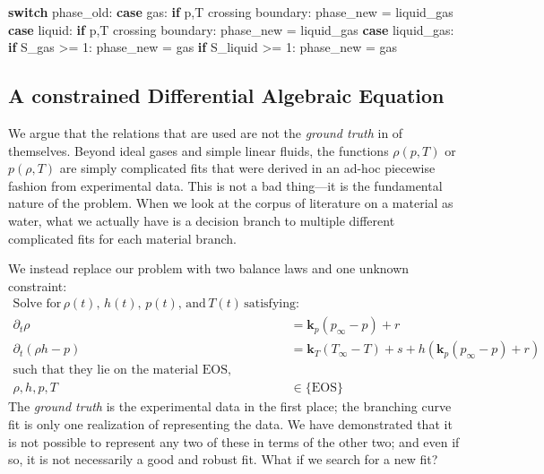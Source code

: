 \documentclass[]{article}
\newenvironment{Shaded}{}{}
\newcommand{\ControlFlowTok}[1]{\textcolor[rgb]{0.00,0.44,0.13}{\textbf{#1}}}
\newcommand{\DecValTok}[1]{\textcolor[rgb]{0.25,0.63,0.44}{#1}}
\newcommand{\NormalTok}[1]{#1}
\begin{document}
\begin{Shaded}
\begin{Highlighting}[]
\ControlFlowTok{switch}\NormalTok{ phase_old:}
  \ControlFlowTok{case}\NormalTok{ gas:}
    \ControlFlowTok{if}\NormalTok{ p,T crossing boundary:}
\NormalTok{      phase_new = liquid_gas}
  \ControlFlowTok{case}\NormalTok{ liquid:}
    \ControlFlowTok{if}\NormalTok{ p,T crossing boundary:}
\NormalTok{      phase_new = liquid_gas}
  \ControlFlowTok{case}\NormalTok{ liquid_gas:}
    \ControlFlowTok{if}\NormalTok{ S_gas >= }\DecValTok{1}\NormalTok{:}
\NormalTok{      phase_new = gas}
    \ControlFlowTok{if}\NormalTok{ S_liquid >= }\DecValTok{1}\NormalTok{:}
\NormalTok{      phase_new = gas}
\end{Highlighting}
\end{Shaded}

\hypertarget{header-n3262}{%
\subsection{A constrained Differential Algebraic
Equation}\label{header-n3262}}

We argue that the relations that are used are not the \emph{ground
truth} in of themselves. Beyond ideal gases and simple linear fluids,
the functions \(\rho(p,T)\) or \(p(\rho,T)\) are simply complicated fits
that were derived in an ad-hoc piecewise fashion from experimental data.
This is not a bad thing---it is the fundamental nature of the problem.
When we look at the corpus of literature on a material as water, what we
actually have is a decision branch to multiple different complicated
fits for each material branch.

We instead replace our problem with two balance laws and one unknown
constraint:
\begin{align}
\text{Solve for}\, \rho(t), \, h(t), \, p(t),\, \text{and}\, T(t)\, \text{satisfying:}\\
\partial_t \rho &  = \mathbf{k}_p(p_\infty - p) + r\\
\partial_t (\rho h-p) & = \mathbf{k}_T(T_\infty-T)  + s + h\left(\mathbf{k}_p(p_\infty - p) + r\right) \\
\text{such that they lie on the material EOS,}\\
\rho,h,p,T & \in \{\text{EOS}\}
\end{align}
The \emph{ground truth} is the experimental data in the first place; the
branching curve fit is only one realization of representing the data. We
have demonstrated that it is not possible to represent any two of these
in terms of the other two; and even if so, it is not necessarily a good
and robust fit. What if we search for a new fit?
\end{document}
